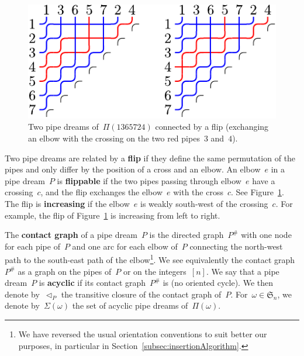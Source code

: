 \documentclass{amsart}
\theoremstyle{definition}
\newcommand{\N}{\mathbb{N}} %
\newcommand{\eqdef}{\mbox{\,\raisebox{0.2ex}{\scriptsize\ensuremath{\mathrm:}}\ensuremath{=}\,}} %
\newcommand{\fref}[1]{Figure~\ref{#1}} %
\newcommand{\defn}[1]{\textbf{\textsf{\color{PineGreen} #1}}} %
\newcommand{\vincent}[1]{\todo[color=blue!30]{#1 \\ \hfill --- V.}}
\newcommand{\fS}{\mathfrak{S}} %
\newcommand{\pipeDreams}{\Pi} %
\newcommand{\contact}{^\#} %
\newcommand{\acyclicPipeDreams}{\Sigma} %
\newcommand{\less}{\vartriangleleft} %
\newcommand{\contactLess}[1]{\less_{#1}} %
\begin{document}
\begin{figure}[ht]
	\centerline{
		\includegraphics[scale=.9]{pipeDreams}
	}
	\caption{Two pipe dreams of~$\pipeDreams(1365724)$ connected by a flip (exchanging an elbow with the crossing on the two red pipes~$3$ and~$4$).}
	\label{fig:pipeDreams}
\end{figure}

Two pipe dreams are related by a \defn{flip} if they define the same permutation of the pipes and only differ by the position of a cross and an elbow. An elbow~$e$ in a pipe dream~$P$ is \defn{flippable} if the two pipes passing through elbow~$e$ have a crossing~$c$, and the flip exchanges the elbow~$e$ with the cross~$c$. See \fref{fig:pipeDreams}. The flip is \defn{increasing} if the elbow~$e$ is weakly south-west of the crossing~$c$. For example, the flip of \fref{fig:pipeDreams} is increasing from left to right.

The \defn{contact graph} of a pipe dream~$P$ is the directed graph~$P\contact$ with one node for each pipe of~$P$ and one arc for each elbow of~$P$ connecting the north-west path to the south-east path of the elbow\footnote{We have reversed the usual orientation conventions to suit better our purposes, in particular in Section~\ref{subsec:insertionAlgorithm}.}. We see equivalently the contact graph~$P\contact$ as a graph on the pipes of~$P$ or on the integers~$[n]$. We say that a pipe dream~$P$ is \defn{acyclic} if its contact graph~$P\contact$ is (no oriented cycle). We then denote by~$\contactLess{P}$ the transitive closure of the contact graph of~$P$. For~$\omega \in \fS_n$, we denote by~$\acyclicPipeDreams(\omega)$ the set of acyclic pipe dreams of~$\pipeDreams(\omega)$.


\end{document}
